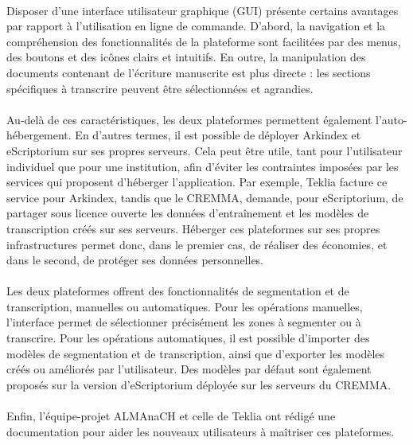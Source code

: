 \documentclass[a4paper,12pt,twoside]{book}
\begin{document}
\paragraph{}
Disposer d’une interface utilisateur graphique (GUI) présente certains avantages par rapport à l’utilisation en ligne de commande. D’abord, la navigation et la compréhension des fonctionnalités de la plateforme sont facilitées par des menus, des boutons et des icônes clairs et intuitifs. En outre, la manipulation des documents contenant de l’écriture manuscrite est plus directe : les sections spécifiques à transcrire peuvent être sélectionnées et agrandies.

\paragraph{}
Au-delà de ces caractéristiques, les deux plateformes permettent également l'auto-hébergement. En d’autres termes, il est possible de déployer Arkindex et eScriptorium sur ses propres serveurs. Cela peut être utile, tant pour l'utilisateur individuel que pour une institution, afin d'éviter les contraintes imposées par les services qui proposent d’héberger l’application. Par exemple, Teklia facture ce service pour Arkindex, tandis que le CREMMA, demande, pour eScriptorium, de partager sous licence ouverte les données d'entraînement et les modèles de transcription créés sur ses serveurs. Héberger ces plateformes sur ses propres infrastructures permet donc, dans le premier cas, de réaliser des économies, et dans le second, de protéger ses données personnelles.

\paragraph{}
Les deux plateformes offrent des fonctionnalités de segmentation et de transcription, manuelles ou automatiques. Pour les opérations manuelles, l'interface permet de sélectionner précisément les zones à segmenter ou à transcrire. Pour les opérations automatiques, il est possible d'importer des modèles de segmentation et de transcription, ainsi que d’exporter les modèles créés ou améliorés par l’utilisateur. Des modèles par défaut sont également proposés sur la version d’eScriptorium déployée sur les serveurs du CREMMA.

\paragraph{}
Enfin, l'équipe-projet ALMAnaCH et celle de Teklia ont rédigé une documentation pour aider les nouveaux utilisateurs à maîtriser ces plateformes.
\end{document}
